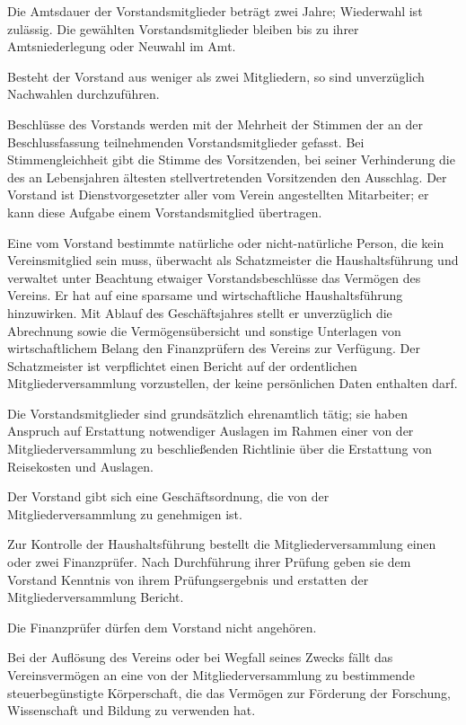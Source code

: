 \documentclass[12pt,ngerman]{scrartcl}
\begin{document}
\begin{contract}
Die Amtsdauer der Vorstandsmitglieder beträgt zwei Jahre; Wiederwahl ist zulässig. Die gewählten Vorstandsmitglieder bleiben bis zu ihrer Amtsniederlegung oder Neuwahl im Amt.

Besteht der Vorstand aus weniger als zwei Mitgliedern, so sind unverzüglich Nachwahlen durchzuführen.

Beschlüsse des Vorstands werden mit der Mehrheit der Stimmen der an der Beschlussfassung teilnehmenden Vorstandsmitglieder gefasst. Bei Stimmengleichheit gibt die Stimme des Vorsitzenden, bei seiner Verhinderung die des an Lebensjahren ältesten stellvertretenden Vorsitzenden den Ausschlag. Der Vorstand ist Dienstvorgesetzter aller vom Verein angestellten Mitarbeiter; er kann diese Aufgabe einem Vorstandsmitglied übertragen.

Eine vom Vorstand bestimmte natürliche oder nicht-natürliche Person, die kein Vereinsmitglied sein muss, überwacht als Schatzmeister die Haushaltsführung und verwaltet unter Beachtung etwaiger Vorstandsbeschlüsse das Vermögen des Vereins. Er hat auf eine sparsame und wirtschaftliche Haushaltsführung hinzuwirken. Mit Ablauf des Geschäftsjahres stellt er unverzüglich die Abrechnung sowie die Vermögensübersicht und sonstige Unterlagen von wirtschaftlichem Belang den Finanzprüfern des Vereins zur Verfügung. Der Schatzmeister ist verpflichtet einen Bericht auf der ordentlichen Mitgliederversammlung vorzustellen, der keine persönlichen Daten enthalten darf.

Die Vorstandsmitglieder sind grundsätzlich ehrenamtlich tätig; sie haben Anspruch auf Erstattung notwendiger Auslagen im Rahmen einer von der Mitgliederversammlung zu beschließenden Richtlinie über die Erstattung von Reisekosten und Auslagen.

Der Vorstand gibt sich eine Geschäftsordnung, die von der Mitgliederversammlung zu genehmigen ist.



Zur Kontrolle der Haushaltsführung bestellt die Mitgliederversammlung einen oder zwei Finanzprüfer. Nach Durchführung ihrer Prüfung geben sie dem Vorstand Kenntnis von ihrem Prüfungsergebnis und erstatten der Mitgliederversammlung Bericht.

Die Finanzprüfer dürfen dem Vorstand nicht angehören.


Bei der Auflösung des Vereins oder bei Wegfall seines Zwecks fällt das Vereinsvermögen an eine von der Mitgliederversammlung zu bestimmende steuerbegünstigte Körperschaft, die das Vermögen zur Förderung der Forschung, Wissenschaft und Bildung zu verwenden hat.


\end{contract}
\end{document}
